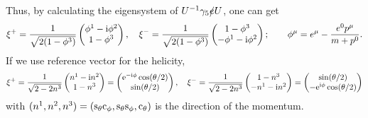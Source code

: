 \documentclass[CheatSheet]{subfiles}
\begin{document}
Thus, by calculating the eigensystem of $U^{-1}\gamma_5\slashed {e} U$, one can get
\begin{equation}
 \xi^+ = \frac{1}{\sqrt{2(1-\phi^3)}}\begin{pmatrix}\phi^1-{\mathrm{i}} \phi^2 \\ 1-\phi^3\end{pmatrix},\quad
 \xi^- = \frac{1}{\sqrt{2(1-\phi^3)}}\begin{pmatrix}1-\phi^3\\-\phi^1-{\mathrm{i}} \phi^2\end{pmatrix};\qquad
 \phi^\mu = e^\mu-\frac{e^0p^\mu}{m+p^0}.
\end{equation}
If we use reference vector for the helicity, 
\begin{equation}
 \xi^+ = \frac1{\sqrt{2-2n^3}}\begin{pmatrix}n^1-{\mathrm{i}} n^2\\1-n^3\end{pmatrix}
       =\begin{pmatrix}{\mathrm{e}}^{-{\mathrm{i}}\phi}\cos(\theta/2)\\\sin(\theta/2)\end{pmatrix},\quad
 \xi^- = \frac1{\sqrt{2-2n^3}}\begin{pmatrix}1-n^3\\-n^1-{\mathrm{i}} n^2\end{pmatrix}
       =\begin{pmatrix}\sin(\theta/2)\\-{\mathrm{e}}^{{\mathrm{i}}\phi}\cos(\theta/2)\end{pmatrix}
\end{equation}
with $(n^1,n^2,n^3)=(\mathrm{s}_{\theta}\mathrm{c}_{\phi},\mathrm{s}_{\theta}\mathrm{s}_{\phi},\mathrm{c}_{\theta})$ is the direction of the momentum.
\end{document}
